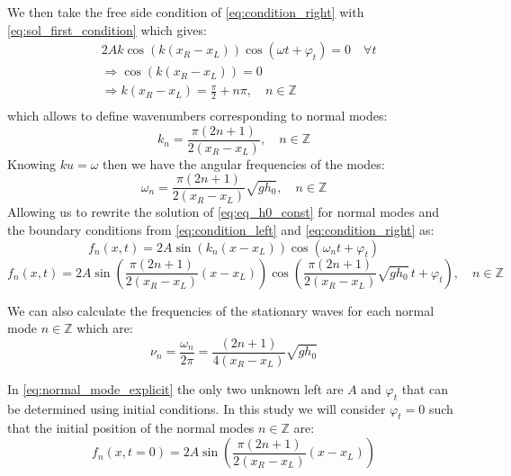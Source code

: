 We then take the free side condition of \autoref{eq:condition_right} with \autoref{eq:sol_first_condition} which gives:
\[
    \begin{aligned}
        & 2A k \cos(k(x_R-x_L))\cos(\omega t + \varphi_t) = 0 \quad \forall t \\
        & \Rightarrow \cos(k(x_R-x_L)) = 0 \\
        & \Rightarrow k(x_R-x_L) = \frac{\pi}{2} + n\pi, \quad n \in \mathbb{Z} \\
    \end{aligned}
\]
which allows to define wavenumbers corresponding to normal modes:
\begin{equation}
    k_n = \frac{\pi(2n + 1)}{2(x_R-x_L)}, \quad n \in \mathbb{Z}
    \label{eq:wavenumber_mode}
\end{equation}
Knowing $ku = \omega$ then we have the angular frequencies of the modes:
\begin{equation}
    \omega_n = \frac{\pi(2n + 1)}{2(x_R-x_L)} \sqrt{gh_0}, \quad n \in \mathbb{Z}
    \label{eq:angular_mode}
\end{equation}
Allowing us to rewrite the solution of \autoref{eq:eq_h0_const} for normal modes and the boundary conditions from \autoref{eq:condition_left} and \autoref{eq:condition_right} as:
\begin{equation}
    f_n(x,t) = 2A\sin(k_n(x - x_L))\cos(\omega_n t + \varphi_t)
    \label{eq:normal_mode_simple}
\end{equation}
\begin{equation}
    f_n(x,t) = 2A\sin\left(\frac{\pi(2n + 1)}{2(x_R-x_L)}(x - x_L)\right)\cos\left(\frac{\pi(2n + 1)}{2(x_R-x_L)} \sqrt{gh_0} \, t + \varphi_t\right), \quad n \in \mathbb{Z}
    \label{eq:normal_mode_explicit}
\end{equation}

We can also calculate the frequencies of the stationary waves for each normal mode $n \in \mathbb{Z}$ which are:
\begin{equation}
    \nu_n = \frac{\omega_n}{2\pi} = \frac{(2n + 1)}{4(x_R-x_L)} \sqrt{gh_0}
\end{equation}

In \autoref{eq:normal_mode_explicit} the only two unknown left are $A$ and $\varphi_t$ that can be determined using initial conditions. In this study we will consider $\varphi_t = 0$ such that the initial position of the normal modes $n \in \mathbb{Z}$ are:
\begin{equation}
    f_n(x,t=0) = 2A\sin\left(\frac{\pi(2n + 1)}{2(x_R-x_L)}(x - x_L)\right)
    \label{eq:normal_initial}
\end{equation}


